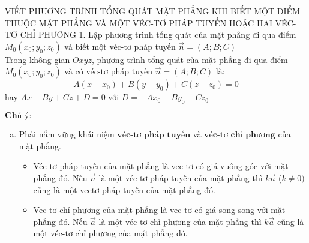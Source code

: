 \begin{dang}{VIẾT PHƯƠNG TRÌNH TỔNG QUÁT MẶT PHẲNG KHI BIẾT MỘT ĐIỂM THUỘC MẶT PHẲNG VÀ MỘT VÉC-TƠ PHÁP TUYẾN HOẶC HAI VÉC-TƠ CHỈ PHƯƠNG}
1. Lập phương trình tổng quát của mặt phẳng đi qua điểm $M_0 \left(x_0;y_0;z_0\right)$ và biết một véc-tơ pháp tuyến $\overrightarrow{n} = \left(A;B;C\right)$\\
Trong không gian $Oxyz$, phương trình tổng quát của mặt phẳng đi qua điểm $M_0 \left(x_0;y_0;z_0\right)$ và có véc-tơ pháp tuyến $\overrightarrow{n}= \left(A;B;C\right)$ là:\\
$$A\left(x-x_0\right) + B\left(y-y_0\right)+C\left(z-z_0\right) = 0$$
hay $Ax+By+Cz+D=0$ với $D= -Ax_0-By_0-Cz_0$
\begin{center}
\end{center}
$\textbf{Chú ý:}$
\begin{enumerate}[a.]
\item Phải nắm vững khái niệm $\textbf{véc-tơ pháp tuyến}$ và $\textbf{véc-tơ chỉ phương}$ của mặt phẳng.
\begin{itemize}
\item Véc-tơ pháp tuyến của mặt phẳng là vec-tơ có giá vuông góc với mặt phẳng đó. Nếu $\overrightarrow{n}$ là một véc-tơ pháp tuyến của mặt phẳng thì $k\overrightarrow{n}$ ($k \neq 0)$ cũng là một vectơ pháp tuyến của mặt phẳng đó.
\item Vec-tơ chỉ phương của mặt phẳng là vec-tơ có giá song song với mặt phẳng đó. Nếu $\overrightarrow{a}$ là một véc-tơ chỉ phương của mặt phẳng thì $k\overrightarrow{a}$ cũng là một véc-tơ chỉ phương của mặt phẳng đó.
\end{itemize}

\end{enumerate}
\end{dang}
